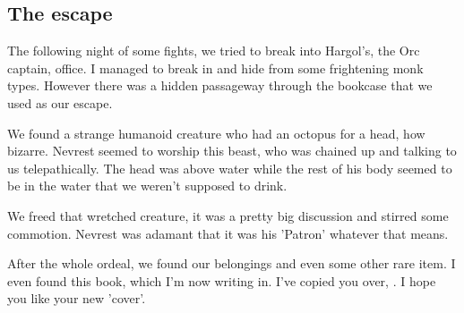 \subsection*{The escape}

The following night of some fights, we tried to break into Hargol's, the Orc captain, office. I managed to break in and hide from some frightening monk types. However there was a hidden passageway through the bookcase that we used as our escape.

We found a strange humanoid creature who had an octopus for a head, how bizarre. Nevrest seemed to worship this beast, who was chained up and talking to us telepathically. The head was above water while the rest of his body seemed to be in the water that we weren't supposed to drink.

We freed that wretched creature, it was a pretty big discussion and stirred some commotion. Nevrest was adamant that it was his 'Patron' whatever that means.

After the whole ordeal, we found our belongings and even some other rare item. I even found this book, which I'm now writing in. I've copied you over, \Master{}. I hope you like your new 'cover'.
